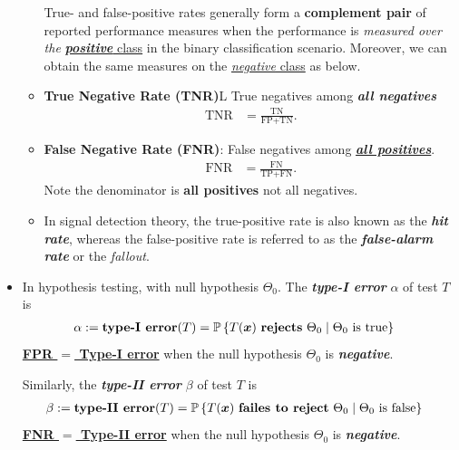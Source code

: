\documentclass[11pt]{article}
\begin{document}
\begin{itemize}
\begin{itemize}
True- and false-positive rates generally form a \textbf{complement pair} of reported performance measures when the performance is \textit{measured over the} \underline{\emph{\textbf{positive}} class}
in the binary classification scenario.  Moreover, we can obtain the same measures on the \underline{\emph{negative} class} as below.

\item \textbf{True Negative Rate (TNR)}L True negatives among \emph{\textbf{all negatives}} 
\begin{align}
\text{TNR} &= \frac{\text{TN}}{\text{FP} + \text{TN}}. \label{eqn: tnr}
\end{align}
\item \textbf{False Negative Rate (FNR)}: False negatives among \underline{\emph{\textbf{all positives}}}. 
\begin{align}
\text{FNR} &= \frac{\text{FN}}{\text{TP} + \text{FN}}. \label{eqn: tnr}
\end{align} Note the denominator is \textbf{all positives} not all negatives. 

\item In signal detection theory, the true-positive rate is also known as the \emph{\textbf{hit rate}}, whereas the false-positive rate is referred to as the \emph{\textbf{false-alarm rate}} or the
\emph{fallout}. 
\end{itemize}

\item In hypothesis testing, with null hypothesis $\Theta_0$. The \textbf{\emph{type-I error}} $\alpha$ of test $T$ is 
\begin{align}
\alpha := \text{\textbf{type-I error}}(T) &= {\mathbb P}\left\{T(\boldsymbol{x}) \text{ \textbf{rejects} }\Theta_0 \;|\; \Theta_{0} \text{ is true}\right\} \label{eqn: type-i_error}
\end{align} \underline{\textbf{FPR $=$ Type-I error}} when the null hypothesis $\Theta_0$ is \emph{\textbf{negative}}.

Similarly, the \emph{\textbf{type-II error}} $\beta$ of test $T$ is 
\begin{align}
\beta:= \text{\textbf{type-II error}}(T) &= {\mathbb P}\left\{T(\boldsymbol{x}) \text{ \textbf{failes to reject} }\Theta_0 \;|\; \Theta_{0} \text{ is false}\right\} \label{eqn: type-ii_error}
\end{align} \underline{\textbf{FNR $=$ Type-II error}} when the null hypothesis $\Theta_0$ is \emph{\textbf{negative}}.


\end{itemize}
\end{document}
